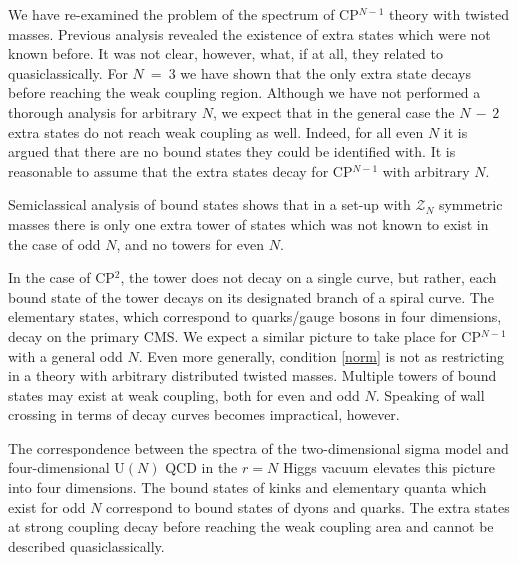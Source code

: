 \documentclass[epsfig,12pt]{article}
\newcommand{\mc}[1]{\mathcal{#1}}
\begin{document}
	We have re-examined the problem of the spectrum of CP$^{N-1}$ theory with twisted masses.
	Previous analysis \cite{Bolokhov:2011mp} revealed the existence of extra states which were not known before.
	It was not clear, however, what, if at all, they related to quasiclassically.
	For $ N ~=~ 3 $ we have shown that the only extra state decays before reaching the weak coupling region.
	Although we have not performed a thorough analysis for arbitrary $ N $, we expect 
	that in the general case the $ N \,-\, 2 $ extra states do not reach weak coupling as well.
	Indeed, for all even $ N $ it is argued that there are no bound states they could be identified with.
	It is reasonable to assume that the extra states decay for CP$^{N-1}$ with arbitrary $ N $.

	Semiclassical analysis of bound states \cite{Dorey:1998yh} shows that in a set-up
	with $ \mc{Z}_N $ symmetric masses there is only one extra tower of states which was not known to exist
	in the case of odd $ N $, and no towers for even $ N $.

	In the case of CP$^2$, the tower does not decay on a single curve, but rather, each bound state of the tower
	decays on its designated branch of a spiral curve. 
	The elementary states, which correspond to quarks/gauge bosons in four dimensions, decay on the primary CMS.
	We expect a similar picture to take place for CP$^{N-1}$ with a general odd $ N $.
	Even more generally, condition \eqref{norm} is not as restricting in a theory with arbitrary distributed 
	twisted masses.
	Multiple towers of bound states may exist at weak coupling, both for even and odd $ N $.
	Speaking of wall crossing in terms of decay curves becomes impractical, however.

	The correspondence between the spectra of the two-dimensional sigma model and four-dimensional U$(N)$ QCD
	in the $r=N$  Higgs vacuum elevates this picture into four dimensions.
	The bound states of kinks and elementary quanta which exist for odd $ N $ correspond to 
	bound states of dyons and quarks.
	The extra states at strong coupling decay before reaching the weak coupling area and 
	cannot be described quasiclassically.

	

\end{document}
